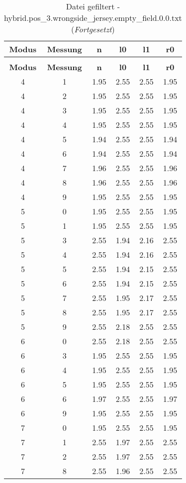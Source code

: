 \begin{longtable}{|c|c||c||c|c||c|}
	\caption{Datei gefiltert - hybrid.pos\_3.wrongside\_jersey.empty\_field.0.0.txt} \label{tab:hybrid.pos-3.wrongside-jersey.empty-field.0.0.txt} \\ \hline
	\textbf{Modus} & \textbf{Messung} & \textbf{n} & \textbf{l0} & \textbf{l1} & \textbf{r0}\\ \hline
	\endfirsthead
	\caption[]{Datei gefiltert - hybrid.pos\_3.wrongside\_jersey.empty\_field.0.0.txt (\emph{Fortgesetzt})} \\ \hline
	\textbf{Modus} & \textbf{Messung} & \textbf{n} & \textbf{l0} & \textbf{l1} & \textbf{r0}\\ \hline
	\endhead
	4 & 1 & 1.95 & 2.55 & 2.55 & 1.95 \\ \hline
	4 & 2 & 1.95 & 2.55 & 2.55 & 1.95 \\ \hline
	4 & 3 & 1.95 & 2.55 & 2.55 & 1.95 \\ \hline
	4 & 4 & 1.95 & 2.55 & 2.55 & 1.95 \\ \hline
	4 & 5 & 1.94 & 2.55 & 2.55 & 1.94 \\ \hline
	4 & 6 & 1.94 & 2.55 & 2.55 & 1.94 \\ \hline
	4 & 7 & 1.96 & 2.55 & 2.55 & 1.96 \\ \hline
	4 & 8 & 1.96 & 2.55 & 2.55 & 1.96 \\ \hline
	4 & 9 & 1.95 & 2.55 & 2.55 & 1.95 \\ \hline
	5 & 0 & 1.95 & 2.55 & 2.55 & 1.95 \\ \hline
	5 & 1 & 1.95 & 2.55 & 2.55 & 1.95 \\ \hline
	5 & 3 & 2.55 & 1.94 & 2.16 & 2.55 \\ \hline
	5 & 4 & 2.55 & 1.94 & 2.16 & 2.55 \\ \hline
	5 & 5 & 2.55 & 1.94 & 2.15 & 2.55 \\ \hline
	5 & 6 & 2.55 & 1.94 & 2.15 & 2.55 \\ \hline
	5 & 7 & 2.55 & 1.95 & 2.17 & 2.55 \\ \hline
	5 & 8 & 2.55 & 1.95 & 2.17 & 2.55 \\ \hline
	5 & 9 & 2.55 & 2.18 & 2.55 & 2.55 \\ \hline
	6 & 0 & 2.55 & 2.18 & 2.55 & 2.55 \\ \hline
	6 & 3 & 1.95 & 2.55 & 2.55 & 1.95 \\ \hline
	6 & 4 & 1.95 & 2.55 & 2.55 & 1.95 \\ \hline
	6 & 5 & 1.95 & 2.55 & 2.55 & 1.95 \\ \hline
	6 & 6 & 1.97 & 2.55 & 2.55 & 1.97 \\ \hline
	6 & 9 & 1.95 & 2.55 & 2.55 & 1.95 \\ \hline
	7 & 0 & 1.95 & 2.55 & 2.55 & 1.95 \\ \hline
	7 & 1 & 2.55 & 1.97 & 2.55 & 2.55 \\ \hline
	7 & 2 & 2.55 & 1.97 & 2.55 & 2.55 \\ \hline
	7 & 8 & 2.55 & 1.96 & 2.55 & 2.55 \\ \hline
\end{longtable}

